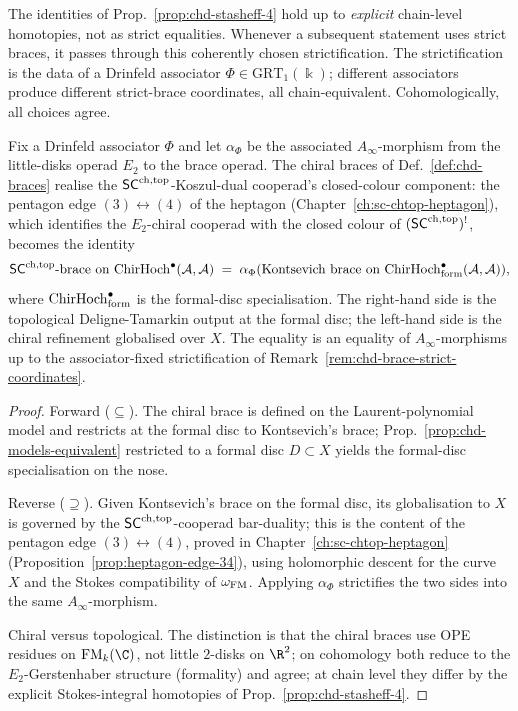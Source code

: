 \begin{remark}%
\label{rem:chd-brace-strict-coordinates}%
%
The identities of Prop.~\ref{prop:chd-stasheff-4} hold up to
\emph{explicit} chain-level homotopies, not as strict equalities.
Whenever a subsequent statement uses strict braces, it passes through
this coherently chosen strictification. The strictification is the data
of a Drinfeld associator $\Phi \in \mathrm{GRT}_1(\Bbbk)$; different
associators produce different strict-brace coordinates, all
chain-equivalent. Cohomologically, all choices agree.
\end{remark}

\begin{theorem}%
\label{thm:chd-deligne-tamarkin}%
%
Fix a Drinfeld associator $\Phi$ and let $\alpha_\Phi$ be the
associated $A_\infty$-morphism from the little-disks operad $E_2$ to
the brace operad. The chiral braces of
Def.~\ref{def:chd-braces} realise the $\mathsf{SC}^{\mathrm{ch},\mathrm{top}}$-Koszul-dual
cooperad's closed-colour component: the pentagon edge
$(3)\leftrightarrow(4)$ of the heptagon
(Chapter~\ref{ch:sc-chtop-heptagon}), which identifies the
$E_2$-chiral cooperad with the closed colour of $(\mathsf{SC}^{\mathrm{ch},\mathrm{top}})^!$,
becomes the identity
\[
 \mathsf{SC}^{\mathrm{ch},\mathrm{top}}\text{-brace on } \mathrm{ChirHoch}^\bullet(\mathcal{A},\mathcal{A})
 \;=\; \alpha_\Phi(\text{Kontsevich brace on } \mathrm{ChirHoch}^\bullet_{\mathrm{form}}(\mathcal{A},\mathcal{A})),
\]
where $\mathrm{ChirHoch}^\bullet_{\mathrm{form}}$ is the formal-disc
specialisation. The right-hand side is the topological Deligne-Tamarkin
output at the formal disc; the left-hand side is the chiral refinement
globalised over $X$. The equality is an equality of
$A_\infty$-morphisms up to the associator-fixed strictification of
Remark~\ref{rem:chd-brace-strict-coordinates}.
\end{theorem}

\begin{proof}
Forward ($\subseteq$). The chiral brace is defined on the
Laurent-polynomial model and restricts at the formal disc to Kontsevich's
brace; Prop.~\ref{prop:chd-models-equivalent} restricted to a formal
disc $D \subset X$ yields the formal-disc specialisation on the nose.

Reverse ($\supseteq$). Given Kontsevich's brace on the formal disc,
its globalisation to $X$ is governed by the $\mathsf{SC}^{\mathrm{ch},\mathrm{top}}$-cooperad
bar-duality; this is the content of the pentagon edge
$(3)\leftrightarrow(4)$, proved in Chapter~\ref{ch:sc-chtop-heptagon}
(Proposition~\ref*{prop:heptagon-edge-34}), using holomorphic descent
for the curve $X$ and the Stokes compatibility of
$\omega_{\mathrm{FM}}$. Applying $\alpha_\Phi$ strictifies the two sides into
the same $A_\infty$-morphism.

Chiral versus topological. The distinction is that the
chiral braces use OPE residues on $\FM_k(\C)$, not little $2$-disks on
$\R^2$; on cohomology both reduce to the $E_2$-Gerstenhaber structure
(formality) and agree; at chain level they differ by the explicit
Stokes-integral homotopies of Prop.~\ref{prop:chd-stasheff-4}.
\end{proof}

